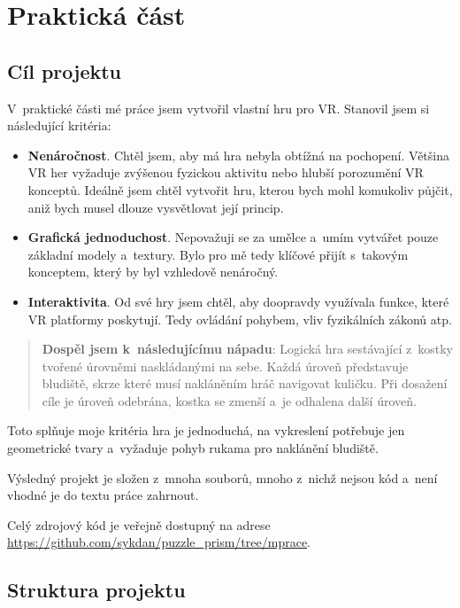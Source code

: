 \part{Praktická část}

\chapter{Cíl projektu}

V~praktické části mé práce jsem vytvořil vlastní hru pro VR. Stanovil jsem si následující kritéria:

\begin{itemize}
  \item \textbf{Nenáročnost}. Chtěl jsem, aby má hra nebyla obtížná na pochopení. Většina VR her vyžaduje zvýšenou fyzickou aktivitu nebo hlubší porozumění VR konceptů. Ideálně jsem chtěl vytvořit hru, kterou bych mohl komukoliv půjčit, aniž bych musel dlouze vysvětlovat její princip.
  \item \textbf{Grafická jednoduchost}. Nepovažuji se za umělce a~umím vytvářet pouze základní modely a~textury. Bylo pro mě tedy klíčové přijít s~takovým konceptem, který by byl vzhledově nenáročný.
  \item \textbf{Interaktivita}. Od své hry jsem chtěl, aby doopravdy využívala funkce, které VR platformy poskytují. Tedy ovládání pohybem, vliv fyzikálních zákonů atp.
\end{itemize}

\begin{quotation}
  
\textbf{Dospěl jsem k~následujícímu nápadu}: Logická hra sestávající z~kostky tvořené úrovněmi naskládanými na sebe. Každá úroveň představuje bludiště, skrze které musí nakláněním hráč navigovat kuličku. Při dosažení cíle je úroveň odebrána, kostka se zmenší a~je odhalena další úroveň.
\end{quotation}

Toto splňuje moje kritéria \poml hra je jednoduchá, na vykreslení potřebuje jen geometrické tvary a~vyžaduje pohyb rukama pro naklánění bludiště.

Výsledný projekt je složen z~mnoha souborů, mnoho z~nichž nejsou kód a~není vhodné je do textu práce zahrnout. 

Celý zdrojový kód je veřejně dostupný na adrese \url{https://github.com/sykdan/puzzle_prism/tree/mprace}. 

\chapter{Struktura projektu}

